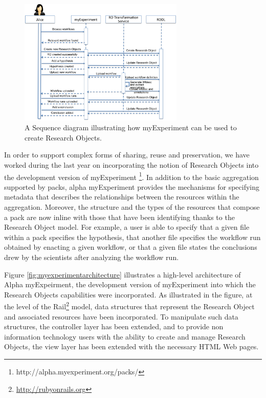\begin{figure}
\begin{center}
\includegraphics[width=0.7\textwidth]{Figures/myexperimentInteractions.png}
\end{center}
\caption{A Sequence diagram illustrating how myExperiment can be used to create Research Objects.}
\label{fig:myexperimentinteractions}
\end{figure} 
 
In order to support complex forms of sharing, reuse and preservation, we have worked during the last year on incorporating the notion of Research Objects into the development version of myExperiment \footnote{http://alpha.myexperiment.org/packs/}. In addition to the basic aggregation supported by packs, alpha myExperiment provides the mechanisms for specifying metadata that describes the relationships between the resources within the aggregation. Moreover, the structure and the types of the resources that compose a pack are now inline with those that have been identifying thanks to the Research Object model. For example, a user is able to specify that a given file within a pack specifies the hypothesis, that another file specifies the workflow run obtained by enacting a given workflow, or that a given file states the conclusions drew by the scientists after analyzing the workflow run.


Figure \ref{fig:myexperimentarchitecture} illustrates a high-level architecture of Alpha myExpeirment, the development version of myExperiment into which the Research Objects capabilities were incorporated. As illustrated in the figure, at the level of the Rail\footnote{\url{http://rubyonrails.org}} model, data structures that represent the Research Object and associated resources have been incorporated. To manipulate such data structures, the controller layer has been extended, and to provide non information technology users with the ability to create and manage Research Objects, the view layer has been extended with the necessary HTML Web pages.



